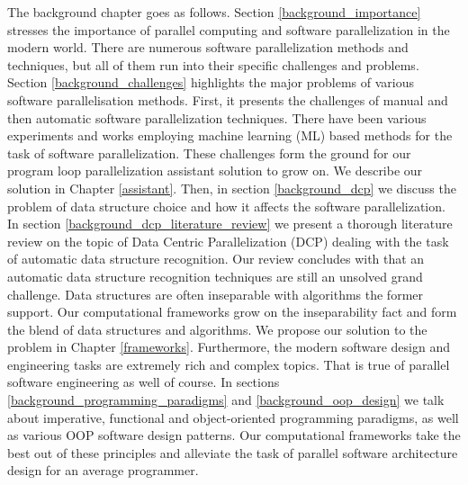 %
% 
%
\quad The background chapter goes as follows. Section \ref{background_importance} stresses the importance of parallel computing and software parallelization in the modern world. There are numerous software parallelization methods and techniques, but all of them run into their specific challenges and problems. Section \ref{background_challenges} highlights the major problems of various software parallelisation methods. First, it presents the challenges of manual and then automatic software parallelization techniques. There have been various experiments and works employing machine learning (ML) based methods for the task of software parallelization. These challenges form the ground for our program loop parallelization assistant solution to grow on. We describe our solution in Chapter \ref{assistant}. Then, in section \ref{background_dcp} we discuss the problem of data structure choice and how it affects the software parallelization. In section \ref{background_dcp_literature_review} we present a thorough literature review on the topic of Data Centric Parallelization (DCP) dealing with the task of automatic data structure recognition. Our review concludes with that an automatic data structure recognition techniques are still an unsolved grand challenge. Data structures are often inseparable with algorithms the former support. Our computational frameworks grow on the inseparability fact and form the blend of data structures and algorithms. We propose our solution to the problem in Chapter \ref{frameworks}. Furthermore, the modern software design and engineering tasks are extremely rich and complex topics. That is true of parallel software engineering as well of course. In sections \ref{background_programming_paradigms} and \ref{background_oop_design} we talk about imperative, functional and object-oriented programming paradigms, as well as various OOP software design patterns. Our computational frameworks take the best out of these principles and alleviate the task of parallel software architecture design for an average programmer.
